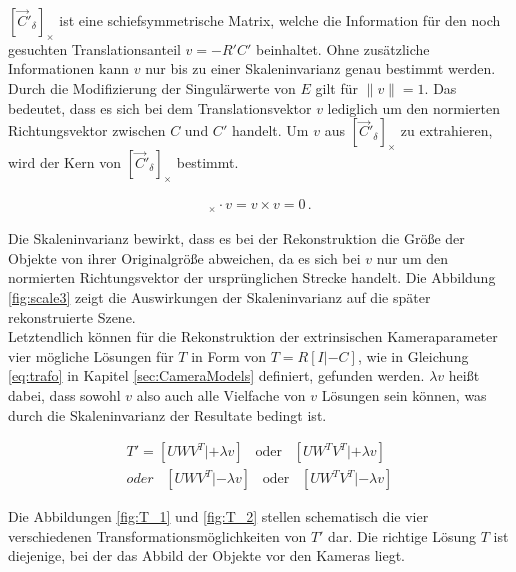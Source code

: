 $[\overrightarrow{C}'_\delta]_\times$ ist eine schiefsymmetrische Matrix, welche die Information für den noch gesuchten Translationsanteil $v = -R'C'$ beinhaltet. Ohne zusätzliche Informationen kann $v$ nur bis zu einer Skaleninvarianz genau bestimmt werden\cite{HZ,Ferid,phdextrinsicPara}. Durch die Modifizierung der Singulärwerte von $E$ gilt für $\parallel v \parallel = 1$\cite{HZ,Ferid}. Das bedeutet, dass es sich bei dem Translationsvektor $v$ lediglich um den normierten Richtungsvektor zwischen $C$ und $C'$ handelt\cite{KIT}. Um $v$ aus $[\overrightarrow{C}'_\delta]_\times$ zu extrahieren, wird der Kern von $[\overrightarrow{C}'_\delta]_\times$ bestimmt.


\begin{gather}
[\overrightarrow{C}'_\delta]_\times \cdot v = v \times v = 0 \, .
\end{gather} 


Die Skaleninvarianz bewirkt, dass es bei der Rekonstruktion die Größe der Objekte von ihrer Originalgröße abweichen, da es sich bei $v$ nur um den normierten Richtungsvektor der ursprünglichen Strecke handelt. Die Abbildung \ref{fig:scale3} zeigt die Auswirkungen der Skaleninvarianz auf die später rekonstruierte Szene. \\

Letztendlich können für die Rekonstruktion der extrinsischen Kameraparameter vier mögliche Lösungen für $T$ in Form von $T = R[I|-C]$, wie in Gleichung \ref{eq:trafo} in Kapitel \ref{sec:CameraModels} definiert, gefunden werden\cite{HZ,Ferid,phdextrinsicPara}. $\lambda v$ heißt dabei, dass sowohl $v$ also auch alle Vielfache von $v$ Lösungen sein können, was durch die Skaleninvarianz der Resultate bedingt ist\cite{HZ,Ferid,phdextrinsicPara}. 

\begin{gather}
T' = [UWV^T|+\lambda v] \;\;\; \text{oder} \;\;\;[UW^TV^T|+\lambda v]\\
\textit{oder}\;\;\; [UWV^T|-\lambda v] \;\;\; \text{oder} \;\;\;[UW^TV^T|-\lambda v]
\end{gather}

Die Abbildungen \ref{fig:T_1} und \ref{fig:T_2} stellen schematisch die vier verschiedenen Transformationsmöglichkeiten von $T'$ dar. Die richtige Lösung $T$ ist diejenige, bei der das Abbild der Objekte vor den Kameras liegt.\\\\


